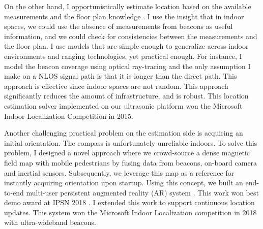 \documentclass[10pt]{article}
\begin{document}
On the other hand, I opportunistically estimate location based on the available measurements and the floor plan knowledge \cite{rajagopal2018enhancing}. I use the insight that in indoor spaces, we could use the absence of measurements from beacons as useful information, and we could check for consistencies between the measurements and the floor plan. I use models that are simple enough to generalize across indoor environments and ranging technologies, yet practical enough. For instance, I model the beacon coverage using optical ray-tracing and the only assumption I make on a NLOS signal path is that it is longer than the direct path. This approach is effective since indoor spaces are not random. %
This approach significantly reduces the amount of infrastructure, and is robust. %
This location estimation solver implemented on our ultrasonic platform won the Microsoft Indoor Localization Competition in 2015. %

Another challenging practical problem on the estimation side is acquiring an initial orientation. The compass is unfortunately unreliable indoors. 
To solve this problem,  I designed a novel approach  where we crowd-source a dense magnetic field map with mobile pedestrians by fusing data from beacons, on-board camera and inertial sensors. Subsequently, we leverage this map as a reference for instantly acquiring orientation upon startup. 
Using this concept, we built an end-to-end multi-user persistent augmented reality (AR) system \cite{mobileAR}. This work won best demo award at IPSN 2018 \cite{rajagopal2018welcome}. I extended this work to support continuous location updates. This system won the Microsoft Indoor Localization competition in 2018 with ultra-wideband beacons. 
\end{document}
